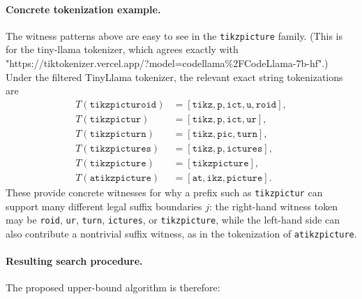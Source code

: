 \paragraph{Concrete tokenization example.}
The witness patterns above are easy to see in the \texttt{tikzpicture} family.
(This is for the tiny-llama tokenizer, which agrees exactly with 
"https://tiktokenizer.vercel.app/?model=codellama\%2FCodeLlama-7b-hf".)
Under the filtered TinyLlama tokenizer, the relevant exact string tokenizations
are
\begin{align*}
    T(\texttt{tikzpicturoid}) &= [\texttt{tikz}, \texttt{p}, \texttt{ict}, \texttt{u}, \texttt{roid}], \\
    T(\texttt{tikzpictur}) &= [\texttt{tikz}, \texttt{p}, \texttt{ict}, \texttt{ur}], \\
    T(\texttt{tikzpicturn}) &= [\texttt{tikz}, \texttt{pic}, \texttt{turn}], \\
    T(\texttt{tikzpictures}) &= [\texttt{tikz}, \texttt{p}, \texttt{ictures}], \\
    T(\texttt{tikzpicture}) &= [\texttt{tikzpicture}], \\
    T(\texttt{atikzpicture}) &= [\texttt{at}, \texttt{ikz}, \texttt{picture}].
\end{align*}
These provide concrete witnesses for why a prefix such as
\texttt{tikzpictur} can support many different legal suffix boundaries $j$:
the right-hand witness token may be \texttt{roid}, \texttt{ur}, \texttt{turn},
\texttt{ictures}, or \texttt{tikzpicture}, while the left-hand side can also
contribute a nontrivial suffix witness, as in the tokenization of
\texttt{atikzpicture}.

\paragraph{Resulting search procedure.}
The proposed upper-bound algorithm is therefore:

